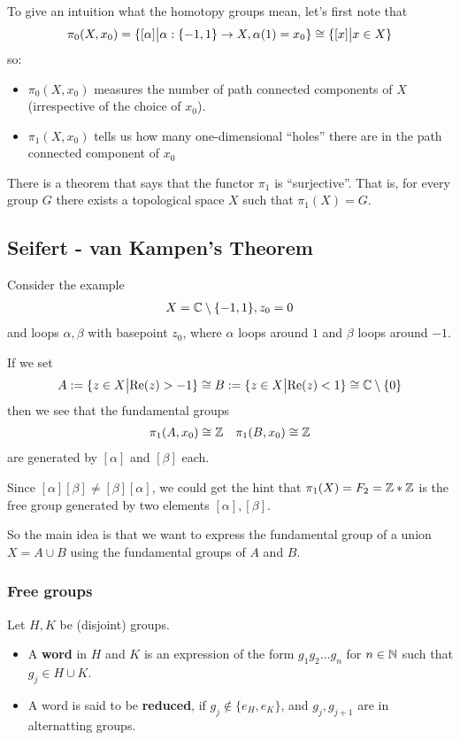 To give an intuition what the homotopy groups mean, let's first note that
\begin{align*}
  \pi_0(X,x_0) = \{[\alpha] \big\vert \alpha: \{-1,1\} \to  X, \alpha(1) = x_0\} \cong \{[x] \big\vert x \in X\}
\end{align*}
so:
\begin{itemize}
  \item $\pi_0(X,x_0)$ measures the number of path connected components of $X$ (irrespective of the choice of $x_0$).
  \item $\pi_1(X,x_0)$ tells us how many one-dimensional ``holes'' there are in the path connected component of $x_0$
\end{itemize}

\begin{rem}[]
  There is a theorem that says that the functor $\pi_1$ is ``surjective''. 
  That is, for every group $G$ there exists a topological space $X$ such that $\pi_1(X) = G$.
\end{rem}

\subsection{Seifert - van Kampen's Theorem}
Consider the example
\begin{align*}
  X = \mathbb{C} \setminus \{-1,1\}, z_0 = 0
\end{align*}
and loops $\alpha,\beta$ with basepoint $z_0$, where $\alpha$ loops around $1$ and $\beta$ loops around $-1$.

If we set
\begin{align*}
  A := \{z \in X \big\vert \text{Re}(z) > -1\} \cong B:= \{z \in X \big\vert \text{Re}(z) < 1\} \cong \mathbb{C} \setminus \{0\}
\end{align*}
then we see that the fundamental groups 
\begin{align*}
  \pi_1(A,x_0) \cong \mathbb{Z} \quad \pi_1(B,x_0) \cong \mathbb{Z}
\end{align*}
are generated by $[\alpha]$ and $[\beta]$ each.

Since $[\alpha] [\beta] \neq [\beta] [\alpha]$, we could get the hint that $\pi_1(X) = F_2 = \mathbb{Z} \ast \mathbb{Z}$ is the free group generated by two elements $[\alpha],[\beta]$.

So the main idea is that we want to express the fundamental group of a union $X = A \cup B$ using the fundamental groups of $A$ and $B$.


\subsubsection*{Free groups}
\begin{dfn}[]
  Let $H,K$ be (disjoint) groups. 
  \begin{itemize}
    \item A \textbf{word} in $H$ and $K$ is an expression of the form $g_1g_2 \dots g_n$ for $n \in \mathbb{N}$ such that $g_j \in H \cup K$.
    \item A word is said to be \textbf{reduced}, if $g_j \notin \{e_H,e_K\}$, and $g_j,g_{j+1}$ are in alternatting groups.
  \end{itemize}
\end{dfn}

